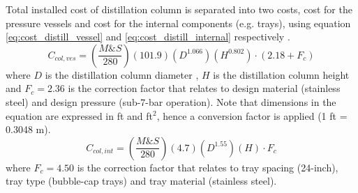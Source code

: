 	\noindent Total installed cost of distillation column is separated into two costs, cost for the pressure vessels and cost for the internal components (e.g. trays), using equation \ref{eq:cost_distill_vessel} and \ref{eq:cost_distill_internal} respectively \citep{douglas1988}.
	\begin{equation}
	    C_{col,ves} = \left(\frac{M\&S}{280}\right)\left(101.9\right)\left(D^{1.066}\right)\left(H^{0.802}\right)\cdot (2.18 + F_c)
	    \label{eq:cost_distill_vessel}
	\end{equation}
	where $D$ is the distillation column diameter , $H$ is the distillation column height and $F_c = 2.36$ is the correction factor that relates to design material (stainless steel) and design pressure (sub-7-bar operation). Note that dimensions in the equation are expressed in ft and ft$^2$, hence a conversion factor is applied (1 ft = 0.3048 m).\\
	\begin{equation}
	    C_{col,int} = \left(\frac{M\&S}{280}\right)\left(4.7\right)\left(D^{1.55}\right)\left(H\right)\cdot F_c
	    \label{eq:cost_distill_internal}
	\end{equation}
	where $F_c = 4.50$ is the correction factor that relates to tray spacing (24-inch), tray type (bubble-cap trays) and tray material (stainless steel). \\
    
